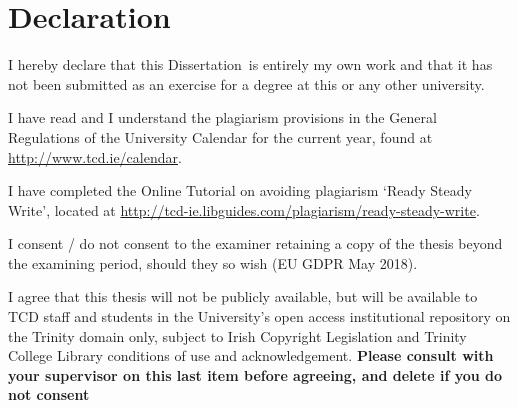 \documentclass[a4paper,oneside,12pt]{book}
\title{\thesistitle}
\author{\authorname}
\newcommand{\typeofthesis}{Dissertation} %
\numberwithin{equation}{chapter} %
\numberwithin{algorithm}{chapter} %
\begin{document}

\section*{\Huge\textcolor{tcd_blue}{Declaration}}
\vspace{1cm}
I hereby declare that this \typeofthesis\ is entirely my own work and that it has not been submitted as an exercise for a degree at this or any other university.

\vspace{1cm}
I have read and I understand the plagiarism provisions in the General Regulations of the University Calendar for the current year, found at \url{http://www.tcd.ie/calendar}.
\vspace{1cm}

I have completed the Online Tutorial on avoiding plagiarism `Ready Steady Write', located at \url{http://tcd-ie.libguides.com/plagiarism/ready-steady-write}.
\vspace{1cm}

I consent / do not consent to the examiner retaining a copy of the thesis beyond the examining period, should they so wish (EU GDPR May 2018).
\vspace{1cm}

I agree that this thesis will not be publicly available, but will be available to TCD staff and students in the University’s open access institutional repository on the Trinity domain only, subject to Irish Copyright Legislation and Trinity College Library conditions of use and acknowledgement.  \textbf{Please consult with your supervisor on this last item before agreeing, and delete if you do not consent}
\vspace{3cm}
\end{document}

